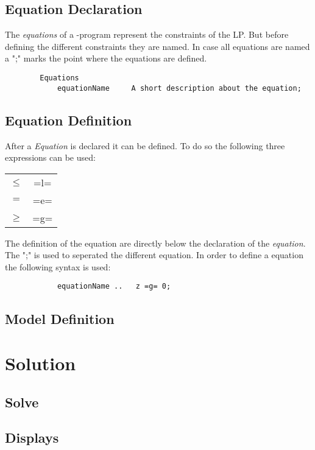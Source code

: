 \documentclass[10pt]{article}
\begin{document}
    \subsection{Equation Declaration}
    \label{model:EquationDec}
      The \emph{equations} of a -program represent the
      constraints of the LP. But before defining the different constraints they
      are named. In case all equations are named a ";" marks the point where the
      equations are defined. 
      \begin{lstlisting}
        Equations
            equationName     A short description about the equation;
      \end{lstlisting}
    
    \subsection{Equation Definition}
    \label{model:EquationDef}
      After a \emph{Equation} is declared it can be defined. To do so the
      following three expressions can be used:
      \begin{table}[h]
        \centering
        \begin{tabular}{ c | c }
          $\leq$ & =l= \\
          $=$ & =e= \\
          $\geq$ & =g= \\
        \end{tabular}
      \end{table}
      The definition of the equation are directly below the declaration of the
      \emph{equation}. The ";" is used to seperated the different equation. In
      order to define a equation the following syntax is used:
      \begin{lstlisting}
            equationName ..   z =g= 0;
      \end{lstlisting}


    \subsection{Model Definition}
    \label{model:ModelDefinition}

  \section{Solution}
  \label{solution}
    
    \subsection{Solve}
    \label{solution:solve}
    
    \subsection{Displays}
    \label{solution:displays}
\end{document}
